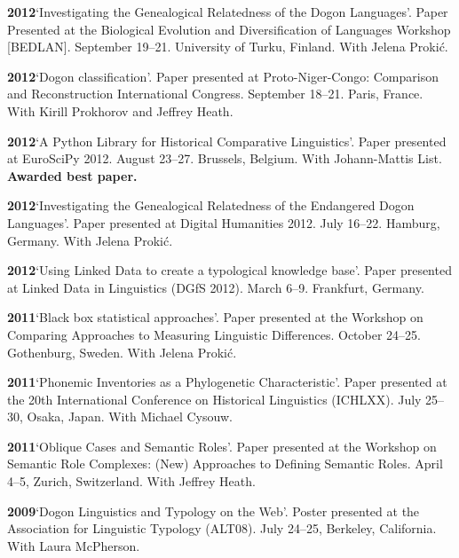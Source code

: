 \documentclass[11pt]{article}
\newcommand{\hangpara}{
 \setlength{\parindent}{0in} %
 \hangindent=0.42in %
}
\begin{document}
\vskip 6pt
\hangpara
{\bf 2012}\hspace{1ex}`Investigating the Genealogical Relatedness of the Dogon Languages'. Paper Presented at the Biological Evolution and Diversification of Languages Workshop [BEDLAN]. September 19--21. University of Turku, Finland. With Jelena Proki{\'c}.

\vskip 6pt
\hangpara
{\bf 2012}\hspace{1ex}`Dogon classification'. Paper presented at Proto-Niger-Congo: Comparison and Reconstruction International Congress. September 18--21. Paris, France. With Kirill Prokhorov and Jeffrey Heath.

\vskip 6pt
\hangpara
{\bf 2012}\hspace{1ex}`A Python Library for Historical Comparative Linguistics'. Paper presented at EuroSciPy 2012. August 23--27. Brussels, Belgium. With Johann-Mattis List. \textbf{Awarded best paper.}

\vskip 6pt
\hangpara
{\bf 2012}\hspace{1ex}`Investigating the Genealogical Relatedness of the Endangered Dogon Languages'. Paper presented at Digital Humanities 2012. July 16--22. Hamburg, Germany. With Jelena Proki{\'c}.

\vskip 6pt
\hangpara
{\bf 2012}\hspace{1ex}`Using Linked Data to create a typological knowledge base'. Paper presented at Linked Data in Linguistics (DGfS 2012). March 6--9. Frankfurt, Germany.

\vskip 6pt
\hangpara
{\bf 2011}\hspace{1ex}`Black box statistical approaches'. Paper presented at the Workshop on Comparing Approaches to Measuring Linguistic Differences. October 24--25. Gothenburg, Sweden. With Jelena Proki{\'c}.

\vskip 6pt
\hangpara
{\bf 2011}\hspace{1ex}`Phonemic Inventories as a Phylogenetic Characteristic'. Paper presented at the 20th International Conference on Historical Linguistics (ICHLXX). July 25--30, Osaka, Japan. With Michael Cysouw.

\vskip 6pt
\hangpara
{\bf 2011}\hspace{1ex}`Oblique Cases and Semantic Roles'. Paper presented at the Workshop on Semantic Role Complexes: (New) Approaches to Defining Semantic Roles. April 4--5, Zurich, Switzerland. With Jeffrey Heath.

\vskip 6pt
\hangpara
{\bf 2009}\hspace{1ex}`Dogon Linguistics and Typology on the Web'. Poster presented at the Association for Linguistic Typology (ALT08). July 24--25, Berkeley, California. With Laura McPherson.
\end{document}
